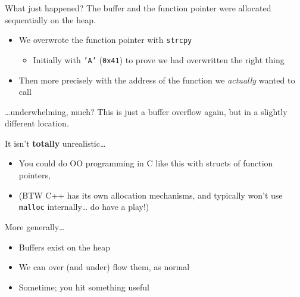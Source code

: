 \documentclass[9pt,aspectratio=169]{beamer}
\renewcommand{\alert}[1]{\textbf{#1}}
\begin{document}
\begin{frame}[label={sec:orga82686b},fragile]{What just happened?}
 The buffer and the function pointer were allocated sequentially on the heap.
\begin{itemize}
\item We overwrote the function pointer with \texttt{strcpy}
\begin{itemize}
\item Initially with \texttt{'A'} (\texttt{0x41}) to prove we had overwritten the right thing
\end{itemize}
\item Then more precisely with the address of the function we \emph{actually} wanted to call
\end{itemize}
\end{frame}
\begin{frame}[label={sec:orgd47d8dd},fragile]{\ldots{}underwhelming, much?}
 This is just a buffer overflow again, but in a slightly different location.

It isn't \alert{totally} unrealistic\ldots{}
\begin{itemize}
\item You could do OO programming in C like this with structs of function pointers,
\item (BTW C++ has its own allocation mechanisms, and typically won't use \texttt{malloc} internally\ldots{} do have a play!)
\end{itemize}

More generally\ldots{}
\begin{itemize}
\item Buffers exist on the heap
\item We can over (and under) flow them, as normal
\item Sometime; you hit something useful
\end{itemize}
\end{frame}
\end{document}
